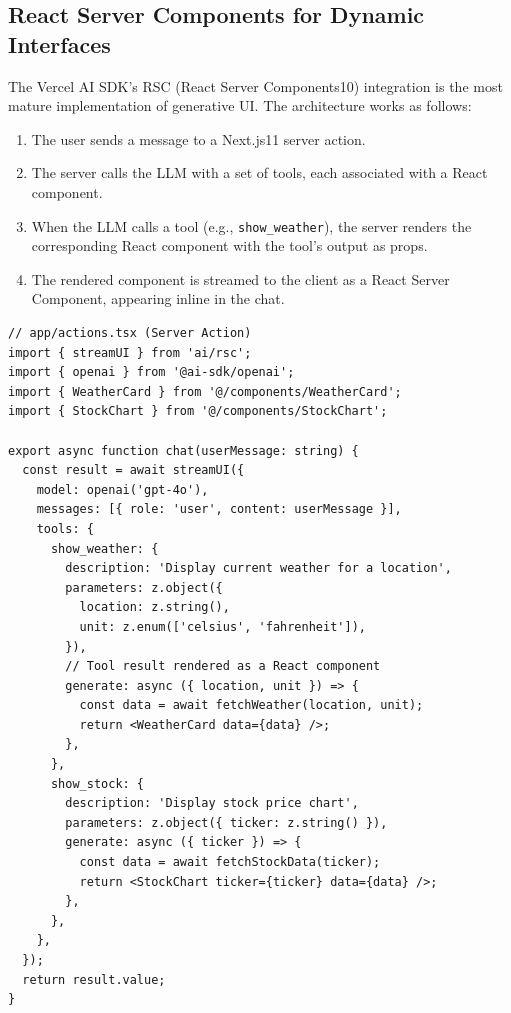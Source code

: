 \subsection{React Server Components for Dynamic Interfaces}
\label{react-server-components-for-dynamic-interfaces}

The Vercel AI SDK’s RSC (React Server Components10) integration is the most mature implementation of generative UI. The architecture works as follows:

\begin{enumerate}
  \item The user sends a message to a Next.js11 server action.
  \item The server calls the LLM with a set of tools, each associated with a React component.
  \item When the LLM calls a tool (e.g., \texttt{show\_weather}), the server renders the corresponding React component with the tool’s output as props.
  \item The rendered component is streamed to the client as a React Server Component, appearing inline in the chat.
\end{enumerate}

\begin{lstlisting}[style=pythonstyle, caption={Generative UI with Vercel AI SDK RSC (TypeScript)}]
// app/actions.tsx (Server Action)
import { streamUI } from 'ai/rsc';
import { openai } from '@ai-sdk/openai';
import { WeatherCard } from '@/components/WeatherCard';
import { StockChart } from '@/components/StockChart';

export async function chat(userMessage: string) {
  const result = await streamUI({
    model: openai('gpt-4o'),
    messages: [{ role: 'user', content: userMessage }],
    tools: {
      show_weather: {
        description: 'Display current weather for a location',
        parameters: z.object({
          location: z.string(),
          unit: z.enum(['celsius', 'fahrenheit']),
        }),
        // Tool result rendered as a React component
        generate: async ({ location, unit }) => {
          const data = await fetchWeather(location, unit);
          return <WeatherCard data={data} />;
        },
      },
      show_stock: {
        description: 'Display stock price chart',
        parameters: z.object({ ticker: z.string() }),
        generate: async ({ ticker }) => {
          const data = await fetchStockData(ticker);
          return <StockChart ticker={ticker} data={data} />;
        },
      },
    },
  });
  return result.value;
}
\end{lstlisting}

